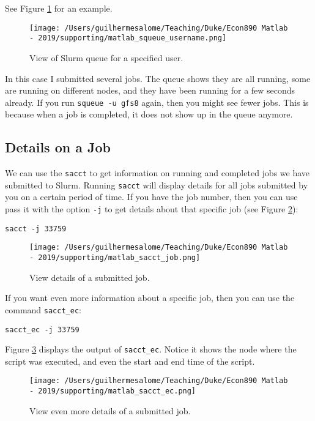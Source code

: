 \documentclass[12pt, a4paper]{article}
\begin{document}
See Figure \ref{fig:org7e64344} for an example.
\begin{figure}[H]
\centering
\texttt{[image: /Users/guilhermesalome/Teaching/Duke/Econ890 Matlab - 2019/supporting/matlab\_squeue\_username.png]}
\caption{\label{fig:org7e64344}
View of Slurm queue for a specified user.}
\end{figure}

In this case I submitted several jobs.
The queue shows they are all running, some are running on different nodes, and they have been running for a few seconds already.
If you run \texttt{squeue -u gfs8} again, then you might see fewer jobs.
This is because when a job is completed, it does not show up in the queue anymore.
\subsection{Details on a Job}
\label{sec:org425be05}
We can use the \texttt{sacct} to get information on running and completed jobs we have submitted to Slurm.
Running \texttt{sacct} will display details for all jobs submitted by you on a certain period of time.
If you have the job number, then you can use pass it with the option \texttt{-j} to get details about that specific job (see Figure \ref{fig:org1a2eb85}):
\lstset{language=bash,label= ,caption= ,captionpos=b,firstnumber=1,numbers=left,style=bash}
\begin{lstlisting}
sacct -j 33759
\end{lstlisting}

\begin{figure}[H]
\centering
\texttt{[image: /Users/guilhermesalome/Teaching/Duke/Econ890 Matlab - 2019/supporting/matlab\_sacct\_job.png]}
\caption{\label{fig:org1a2eb85}
View details of a submitted job.}
\end{figure}

If you want even more information about a specific job, then you can use the command \texttt{sacct\_ec}:
\lstset{language=bash,label= ,caption= ,captionpos=b,firstnumber=1,numbers=left,style=bash}
\begin{lstlisting}
sacct_ec -j 33759
\end{lstlisting}

Figure \ref{fig:orgb271ff2} displays the output of \texttt{sacct\_ec}.
Notice it shows the node where the script was executed, and even the start and end time of the script.

\begin{figure}[H]
\centering
\texttt{[image: /Users/guilhermesalome/Teaching/Duke/Econ890 Matlab - 2019/supporting/matlab\_sacct\_ec.png]}
\caption{\label{fig:orgb271ff2}
View even more details of a submitted job.}
\end{figure}
\end{document}
